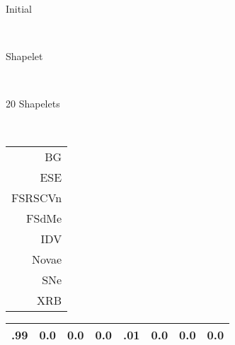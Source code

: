 \begin{figure}[ht!]
\begin{minipage}[c]{\textwidth}
	\label{fig:undistortedcm}
	\centering 
	\begin{minipage}[c]{\textwidth}
		\centering
		\begin{minipage}[c]{0.060000\textwidth}
		\centering
			\quad
		\end{minipage}
		\begin{minipage}[c]{0.270000\textwidth}
		\centering
		\small{
			Initial
		}
		\end{minipage} \ \ 
		\begin{minipage}[c]{0.270000\textwidth}
		\centering
		\small{
			Shapelet
		}
		\end{minipage} \ \ 
		\begin{minipage}[c]{0.270000\textwidth}
		\centering
		\small{
			20 Shapelets
		}
		\end{minipage} \ \ 
\\ 	\end{minipage}
	\vspace{5pt}
	\begin{minipage}[c]{\textwidth}	
	\centering
	\begin{minipage}[c]{0.060000\textwidth}
		\tiny {
		\vspace{-4pt}			\begin{tabular}{r}
				BG\\ 
				ESE\\ 
				FSRSCVn\\ 
				FSdMe\\ 
				IDV\\ 
				Novae\\ 
				SNe\\ 
				XRB\\ 
			\end{tabular}
		}
	\end{minipage}
		\begin{minipage}[c]{0.270000\textwidth}
			\centering
			\tiny {
				\begin{tabular}{|c|c|c|c|c|c|c|c|} \hline
\cellcolor[rgb]{1.0,0.010000,0.010000} .99 & \cellcolor[rgb]{1.0,1.000000,1.000000} 0.0 & \cellcolor[rgb]{1.0,1.000000,1.000000} 0.0 & \cellcolor[rgb]{1.0,1.000000,1.000000} 0.0 & \cellcolor[rgb]{1.0,0.990000,0.990000} .01 & \cellcolor[rgb]{1.0,1.000000,1.000000} 0.0 & \cellcolor[rgb]{1.0,1.000000,1.000000} 0.0 & \cellcolor[rgb]{1.0,1.000000,1.000000} 0.0\\ \hline

\end{tabular}}
\end{minipage}
\end{minipage}
\end{minipage}
\end{figure}
